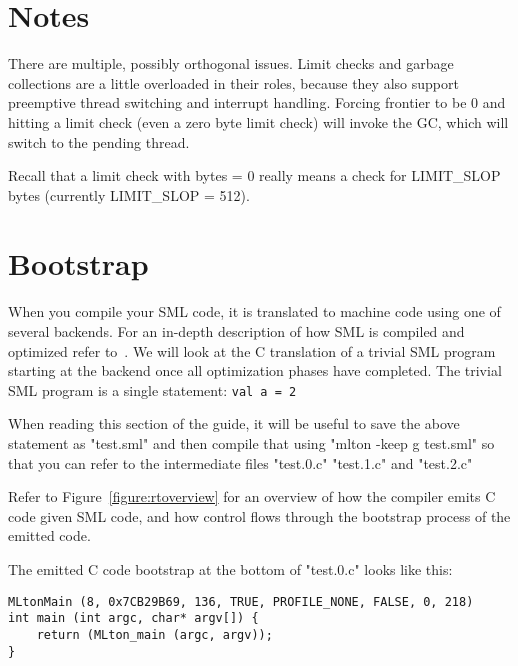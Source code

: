 \section{Notes}

There are multiple, possibly orthogonal issues.  Limit checks and garbage
collections are a little overloaded in their roles, because they also
support preemptive thread switching and interrupt handling.  Forcing
frontier to be 0 and hitting a limit check (even a zero byte limit check)
will invoke the GC, which will switch to the pending thread.

Recall that a limit check with bytes = 0 really means a check for LIMIT\_SLOP
bytes (currently LIMIT\_SLOP = 512).

\section{Bootstrap}

\figBegin
\centerline{}
       
When you compile your SML code, it is translated to machine code using one of several backends. For an in-depth description of how SML is compiled and optimized refer to~\cite{leibig:mlton-llvm-backend}. We will look at the C translation of a trivial SML program starting at the backend once all optimization phases have completed. The trivial SML program is a single statement: \texttt{val a = 2}

When reading this section of the guide, it will be useful to save the above statement as "test.sml" and then compile that using "mlton -keep g test.sml" so that you can refer to the intermediate files "test.0.c" "test.1.c" and "test.2.c"

Refer to Figure~\ref{figure:rtoverview} for an overview of how the compiler emits C code given SML code, and how control flows through the bootstrap process of the emitted code.

 
The emitted C code bootstrap at the bottom of "test.0.c" looks like this:

\begin{minipage}{\linewidth}
\lstset{language=C}\begin{lstlisting}
MLtonMain (8, 0x7CB29B69, 136, TRUE, PROFILE_NONE, FALSE, 0, 218)
int main (int argc, char* argv[]) {
    return (MLton_main (argc, argv));
}
\end{lstlisting}
\end{minipage}

